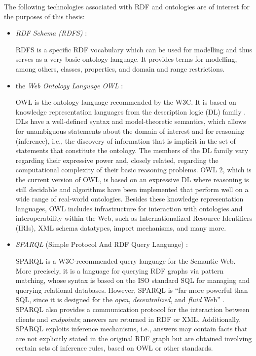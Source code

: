The following technologies associated with RDF and ontologies
are of interest for the purposes of this thesis:
%
\begin{itemize}
  \item
    \emph{RDF Schema (RDFS)} \autocite{RDFS}:
    
    \par
    RDFS is a specific RDF vocabulary which can be used for modelling
    and thus serves as a very basic ontology language.
    It provides terms for modelling, among others, classes, properties, and domain and range restrictions.
  \item
    the \emph{Web Ontology Language OWL} \autocite{OWLPrimer}:
    
    \par
    OWL is the ontology language recommended by the W3C.
    It is based on knowledge representation languages from the description logic (DL) family \autocite{Baader2017}.
    DLs have a well-defined syntax and model-theoretic semantics, which allows
    for unambiguous statements about the domain of interest
    and for reasoning (inference), i.e., the discovery of information that is implicit in the set of statements
    that constitute the ontology.
    The members of the DL family vary regarding their expressive power and,
    closely related, regarding the computational complexity of their basic reasoning problems.
    OWL 2, which is the current version of OWL,
    is based on an expressive DL where reasoning is still decidable and algorithms have been implemented
    that perform well on a wide range of real-world ontologies.
    Besides these knowledge representation languages,
    OWL includes infrastructure for interaction with ontologies and interoperability
    within the Web, such as Internationalized Resource Identifiers (IRIs),
    XML schema datatypes, import mechanisms, and many more.
  \item
    \emph{SPARQL} (Simple Protocol And RDF Query Language) \autocite{SPARQL}:
    
    \par
    SPARQL is a W3C-recommended query language for the Semantic Web.
    More precisely, it is a language for querying RDF graphs via pattern matching,
    whose syntax is based on the ISO standard SQL \autocite{SQL} for managing and querying relational databases.
    However, SPARQL is \enquote{far more powerful than SQL, since it is designed for the \emph{open}, \emph{decentralized}, and \emph{fluid} Web} \autocite{DellaValle2011}.
    SPARQL also provides a communication protocol for the interaction between clients and \emph{endpoints};
    answers are returned in RDF or XML.
    Additionally, SPARQL exploits inference mechanisms,
    i.e., answers may contain facts that are not explicitly stated in the original RDF graph
    but are obtained involving certain sets of inference rules, based on OWL or other standards.
\end{itemize}

